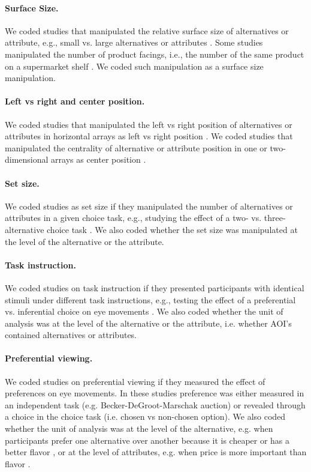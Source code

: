 \documentclass[english,natbib,man,floatsintext]{apa6}
\begin{document}
\paragraph{Surface Size.} We coded studies that manipulated the relative surface size of alternatives or attribute, e.g., small vs. large alternatives or attributes \citep{lohse1997a}. Some studies manipulated the number of product facings, i.e., the number of the same product on a supermarket shelf \citep{chandon2009a}. We coded such manipulation as a surface size manipulation. 

\paragraph{Left vs right and center position.} We coded studies that manipulated the left vs right position of alternatives or attributes in horizontal arrays as left vs right position \citep{kreplin2014a}. We coded studies that manipulated the centrality of alternative or attribute position in one or two-dimensional arrays as center position \citep[experiment 1A \& 1B in][]{atalay2012a,meissner2016a}.

\paragraph{Set size.} We coded studies as set size if they manipulated the number of alternatives or attributes in a given choice task, e.g., studying the effect of a two- vs. three-alternative choice task \citep{hong2016a}. We also coded whether the set size was manipulated at the level of the alternative or the attribute. 

\paragraph{Task instruction.} We coded studies on task instruction if they presented participants with identical stimuli under different task instructions, e.g., testing the effect of a preferential  vs. inferential choice on eye movements \citep{orquin2019a}. We also coded whether the unit of analysis was at the level of the alternative or the attribute, i.e. whether AOI's contained alternatives or attributes. 

\paragraph{Preferential viewing.} We coded studies on preferential viewing if they measured the effect of preferences on eye movements. In these studies preference was either measured in an independent task (e.g. Becker-DeGroot-Marschak auction) or revealed through a choice in the choice task (i.e. chosen vs non-chosen option). We also coded whether the unit of analysis was at the level of the alternative, e.g. when participants prefer one alternative over another because it is cheaper or has a better flavor \citep{gidloef2017a}, or at the level of attributes, e.g. when price is more important than flavor \citep{meissner2016a}. 
\end{document}
